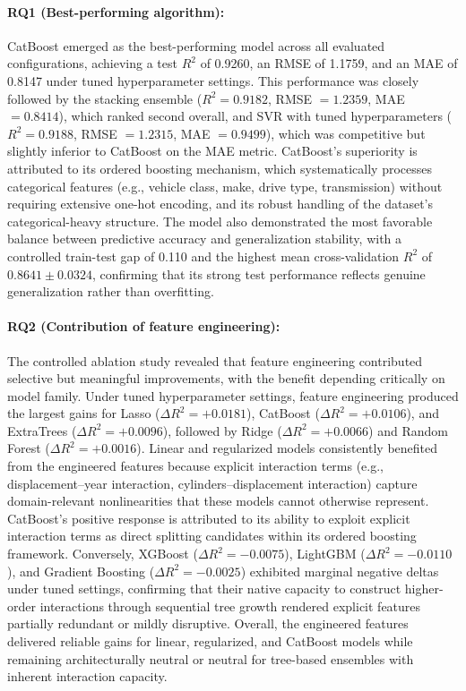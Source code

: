 \paragraph{RQ1 (Best-performing algorithm):}
CatBoost emerged as the best-performing model across all evaluated configurations, achieving a test \(R^2\) of 0.9260, an RMSE of 1.1759, and an MAE of 0.8147 under tuned hyperparameter settings. This performance was closely followed by the stacking ensemble (\(R^2 = 0.9182\), RMSE \(= 1.2359\), MAE \(= 0.8414\)), which ranked second overall, and SVR with tuned hyperparameters (\(R^2 = 0.9188\), RMSE \(= 1.2315\), MAE \(= 0.9499\)), which was competitive but slightly inferior to CatBoost on the MAE metric. CatBoost's superiority is attributed to its ordered boosting mechanism, which systematically processes categorical features (e.g., vehicle class, make, drive type, transmission) without requiring extensive one-hot encoding, and its robust handling of the dataset's categorical-heavy structure. The model also demonstrated the most favorable balance between predictive accuracy and generalization stability, with a controlled train-test gap of 0.110 and the highest mean cross-validation \(R^2\) of \(0.8641 \pm 0.0324\), confirming that its strong test performance reflects genuine generalization rather than overfitting.

\paragraph{RQ2 (Contribution of feature engineering):}
The controlled ablation study revealed that feature engineering contributed selective but meaningful improvements, with the benefit depending critically on model family. Under tuned hyperparameter settings, feature engineering produced the largest gains for Lasso (\(\Delta R^2 = +0.0181\)), CatBoost (\(\Delta R^2 = +0.0106\)), and ExtraTrees (\(\Delta R^2 = +0.0096\)), followed by Ridge (\(\Delta R^2 = +0.0066\)) and Random Forest (\(\Delta R^2 = +0.0016\)). Linear and regularized models consistently benefited from the engineered features because explicit interaction terms (e.g., displacement--year interaction, cylinders--displacement interaction) capture domain-relevant nonlinearities that these models cannot otherwise represent. CatBoost's positive response is attributed to its ability to exploit explicit interaction terms as direct splitting candidates within its ordered boosting framework. Conversely, XGBoost (\(\Delta R^2 = -0.0075\)), LightGBM (\(\Delta R^2 = -0.0110\)), and Gradient Boosting (\(\Delta R^2 = -0.0025\)) exhibited marginal negative deltas under tuned settings, confirming that their native capacity to construct higher-order interactions through sequential tree growth rendered explicit features partially redundant or mildly disruptive. Overall, the engineered features delivered reliable gains for linear, regularized, and CatBoost models while remaining architecturally neutral or neutral for tree-based ensembles with inherent interaction capacity.

